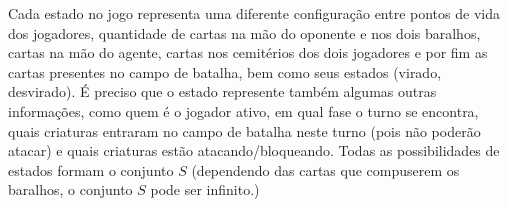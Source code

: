 \documentclass{book}
\begin{document}
Cada estado no jogo representa uma diferente configuração entre pontos de vida dos jogadores, quantidade de cartas na mão do oponente e nos dois baralhos, cartas
na mão do agente, cartas nos cemitérios dos dois jogadores e por fim as cartas presentes no campo de batalha, bem como seus estados (virado, desvirado). É preciso
que o estado represente também algumas outras informações, como quem é o jogador ativo, em qual fase o turno se encontra, quais criaturas entraram no campo de batalha
neste turno (pois não poderão atacar) e quais criaturas estão atacando/bloqueando. Todas as possibilidades de estados formam o conjunto $S$ (dependendo das cartas
que compuserem os baralhos, o conjunto $S$ pode ser infinito.)
\end{document}
